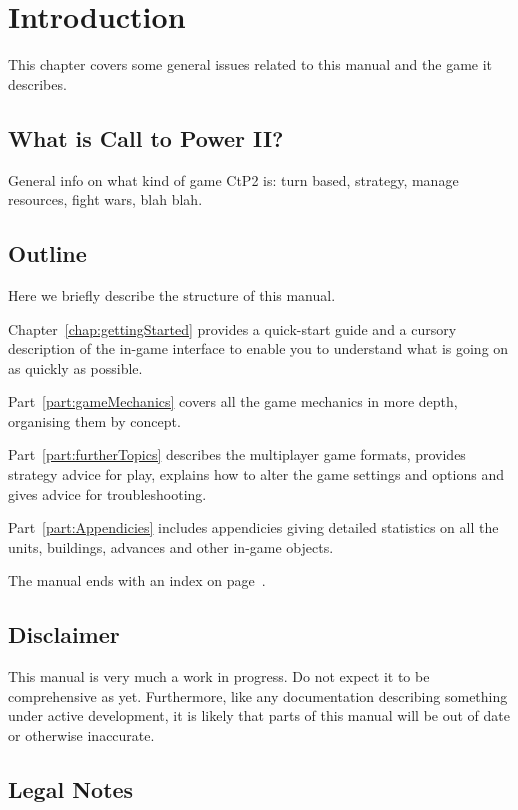 \chapter{Introduction}

This chapter covers some general issues related to this manual and the game it
describes.  

\section{What is Call to Power II?}

General info on what kind of game CtP2 is: turn based, strategy, manage resources, fight wars, blah blah.

\section{Outline}

Here we briefly describe the structure of this manual.

Chapter~\vref{chap:gettingStarted} provides a quick-start guide and a cursory
description of the in-game interface to enable you to understand what is going
on as quickly as possible.

Part~\vref{part:gameMechanics} covers all the game mechanics in more depth,
organising them by concept.

Part~\vref{part:furtherTopics} describes the multiplayer game formats, provides
strategy advice for play, explains how to alter the game settings and options
and gives advice for troubleshooting.

Part~\vref{part:Appendicies} includes appendicies giving detailed statistics on
all the units, buildings, advances and other in-game objects.

The manual ends with an index on page~\pageref{chap:index}.

\section{Disclaimer}

This manual is very much a work in progress.  Do not expect it to be
comprehensive as yet.  Furthermore, like any documentation describing something
under active development, it is likely that parts of this manual will be out of
date or otherwise inaccurate.

\section{Legal Notes}

